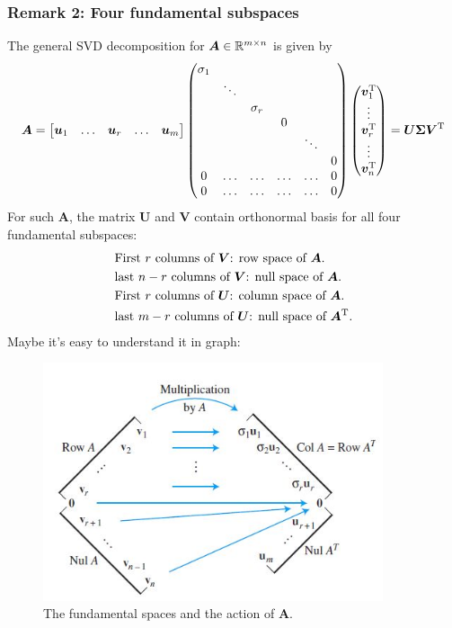 \subsubsection{Remark 2: Four fundamental subspaces}
The general SVD decomposition for $\bm A\in\mathbb{R}^{m\times n}$ is given by
\[
\bm A=\begin{bmatrix}
\bm u_1&\dots&\bm u_r&\dots&\bm u_m
\end{bmatrix}\begin{pmatrix}
\sigma_1&&&&&\\
&\ddots&&&&\\
&&\sigma_r&&&\\
&&&0&&\\
&&&&\ddots&\\
&&&&&0\\
0&\dots&\dots&\dots&\dots&0\\
0&\dots&\dots&\dots&\dots&0\\
\end{pmatrix}
\begin{pmatrix}
\bm v_1^{\mathrm T}\\\vdots\\\bm v_r^{\mathrm T}\\\vdots\\\bm v_n^{\mathrm T}
\end{pmatrix}=\bm U\bm\Sigma\bm V^{\mathrm T}
\]
For such $\bm A$, the matrix $\bm U$ and $\bm V$ contain orthonormal basis for all four fundamental subspaces:
\begin{align*}
&\text{First }r\text{ columns of $\bm V$: }\text{row space of $\bm A$.}\\
&\text{last }n-r\text{ columns of $\bm V$: }\text{null space of $\bm A$.}\\
&\text{First }r\text{ columns of $\bm U$: }\text{column space of $\bm A$.}\\
&\text{last }m-r\text{ columns of $\bm U$: }\text{null space of $\bm A^{\mathrm T}$.}\\
\end{align*}
Maybe it's easy to understand it in graph:
\begin{figure}[H]
\centering
\includegraphics[width=10cm]{week7/fundamental}
\caption{The fundamental spaces and the action of $\bm A$.}
\end{figure}
